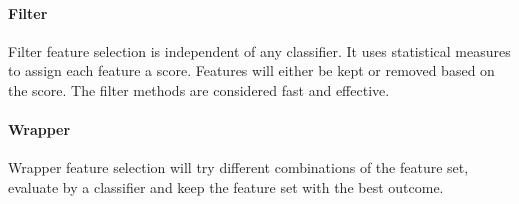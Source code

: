 \documentclass[USenglish]{ifimaster}  %
\begin{document}

	
	
\paragraph{Filter}
Filter feature selection is independent of any classifier. It uses statistical measures to assign each feature a score. Features will either be kept or removed based on the score. The filter methods are considered fast and effective.
	
	
\paragraph{Wrapper}
Wrapper feature selection will try different combinations of the feature set, evaluate by a classifier and keep the feature set with the best outcome.
	
\end{document}
